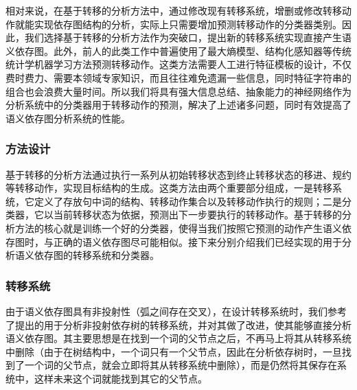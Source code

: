 相对来说，在基于转移的分析方法中，通过修改现有转移系统，增删或修改转移动作就能实现依存图结构的分析，实际上只需要增加预测转移动作的分类器类别。因此，我们选择基于转移的分析方法作为突破口，提出新的转移系统实现直接产生语义依存图。此外，前人的此类工作中普遍使用了最大熵模型、结构化感知器等传统统计学机器学习方法预测转移动作。这类方法需要人工进行特征模板的设计，不仅费时费力、需要本领域专家知识，而且往往难免遗漏一些信息，同时特征字符串的组合也会浪费大量时间。所以我们将具有强大信息总结、抽象能力的神经网络作为分析系统中的分类器用于转移动作的预测，解决了上述诸多问题，同时有效提高了语义依存图分析系统的性能。

\subsubsection{方法设计}

基于转移的分析方法通过执行一系列从初始转移状态到终止转移状态的移进、规约等转移动作，实现目标结构的生成。这类方法由两个重要部分组成，一是转移系统，它定义了存放句中词的结构、转移动作集合以及转移动作执行的规则；二是分类器，它以当前转移状态为依据，预测出下一步要执行的转移动作。基于转移的分析方法的核心就是训练一个好的分类器，使得当我们按照它预测的动作产生语义依存图时，与正确的语义依存图尽可能相似。接下来分别介绍我们已经实现的用于分析语义依存图的转移系统和分类器。

\subsubsection*{转移系统}

由于语义依存图具有非投射性（弧之间存在交叉），在设计转移系统时，我们参考了提出的用于分析非投射依存树的转移系统，并对其做了改进，使其能够直接分析语义依存图。其主要思想是在找到一个词的父节点之后，不再马上将其从转移系统中删除（由于在树结构中，一个词只有一个父节点，因此在分析依存树时，一旦找到了一个词的父节点，就会立即将其从转移系统中删除），而是仍然将其保存在系统中，这样未来这个词就能找到其它的父节点。

